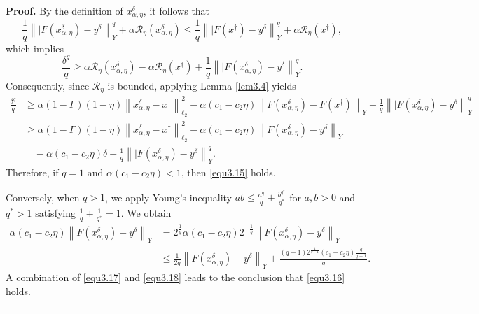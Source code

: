 \documentclass[a4paper,12pt]{article}
\numberwithin{equation}{section}
\newenvironment{proof}[1][Proof]{\textbf{#1.} }
{\ \rule{0.75em}{0.75em}\smallskip}
\begin{document}
\begin{proof}
    By the definition of $x_{\alpha,\eta}^{\delta}$, it follows that
    \begin{equation*}
        \frac{1}{q}\left\||F\left(x_{\alpha,\eta}^{\delta}\right)-y^{\delta}\right\|_{Y}^{q} + \alpha\mathcal{R}_{\eta}\left(x_{\alpha,\eta}^{\delta}\right) \leq \frac{1}{q}\left\||F\left(x^{\dagger}\right)-y^{\delta}\right\|_{Y}^{q} + \alpha\mathcal{R}_{\eta}\left(x^{\dagger}\right),
    \end{equation*}
    which implies
    \begin{equation*}
        \frac{\delta^{q}}{q} \geq \alpha\mathcal{R}_{\eta}\left(x_{\alpha,\eta}^{\delta}\right) - \alpha\mathcal{R}_{\eta}\left(x^{\dagger}\right) + \frac{1}{q} \left\||F\left(x_{\alpha,\eta}^{\delta}\right)-y^{\delta}\right\|_{Y}^{q}.
    \end{equation*}
    Consequently, since $\mathcal{R}_{\eta}$ is bounded, applying Lemma \ref{lem3.4} yields
    \begin{align}\label{equ3.17}
        \frac{\delta^{q}}{q}
        & \geq \alpha\left(1-\Gamma\right)\left(1-\eta\right)\left\|x_{\alpha,\eta}^{\delta}- x^{\dagger}\right\|_{\ell_{2}}^{2}-\alpha\left(c_{1}-c_{2}\eta\right) \left\|F\left(x_{\alpha,\eta}^{\delta}\right)-F\left(x^{\dagger}\right)\right\|_{Y} +\frac{1}{q}\left\||F\left(x_{\alpha,\eta}^{\delta}\right)-y^{\delta}\right\|_{Y}^{q} \nonumber\\
        & \geq \alpha\left(1-\Gamma\right)\left(1-\eta\right)\left\|x_{\alpha,\eta}^{\delta}- x^{\dagger}\right\|_{\ell_{2}}^{2}-\alpha\left(c_{1}-c_{2}\eta\right) \left\|F\left(x_{\alpha,\eta}^{\delta}\right)-y^{\delta}\right\|_{Y} \nonumber\\ 
        & \quad -\alpha\left(c_{1}-c_{2}\eta\right)\delta +\frac{1}{q} \left\||F\left(x_{\alpha,\eta}^{\delta}\right)-y^{\delta}\right\|_{Y}^{q}.
    \end{align}
    Therefore, if $q=1$ and $\alpha\left(c_{1}-c_{2}\eta\right)< 1$, then \eqref{equ3.15} holds.
    
    \par Conversely, when $q>1$, we apply Young's inequality $ab\leq\frac{a^{q}}{q}+ \frac{b^{q^{*}}}{q^{*}}$ for $a,b>0$ and $q^{*}>1$ satisfying $\frac{1}{q}+\frac{1}{q^{*}}=1$. We obtain
    \begin{align}\label{equ3.18}
        \alpha\left(c_{1}-c_{2}\eta\right) \left\|F\left(x_{\alpha,\eta}^{\delta}\right)-y^{\delta}\right\|_{Y} 
        & = 2^{\frac{1}{q}} \alpha\left(c_{1}-c_{2}\eta\right) 2^{-\frac{1}{q}} \left\|F\left(x_{\alpha,\eta}^{\delta}\right)-y^{\delta}\right\|_{Y} \nonumber\\
        & \leq \frac{1}{2q}\left\|F\left(x_{\alpha,\eta}^{\delta}\right)- y^{\delta}\right\|_{Y} + \frac{\left(q-1\right)2^{\frac{1}{q-1}} \left(c_{1}-c_{2}\eta\right)\frac{q}{q-1}}{q}.
    \end{align}
    A combination of \eqref{equ3.17} and \eqref{equ3.18} leads to the conclusion that \eqref{equ3.16} holds.    
\end{proof}
\end{document}
